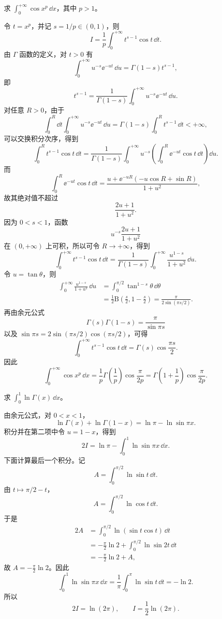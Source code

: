 \begin{xreferenceproblem}[13]
求 $\displaystyle\int_0^{+\infty}\cos x^p\,\dd x$，其中 $p>1$。
\end{xreferenceproblem}
\begin{xsolution}
令 $t=x^p$，并记 $s=1/p\in(0,1)$，则
\[
I=\frac1p\int_0^{+\infty}t^{s-1}\cos t\,\dd t.
\]
由 $\Gamma$ 函数的定义，对 $t>0$ 有
\[
\int_0^{+\infty}u^{-s}\ee^{-ut}\,\dd u
=\Gamma(1-s)t^{s-1},
\]
即
\[
t^{s-1}=\frac1{\Gamma(1-s)}
\int_0^{+\infty}u^{-s}\ee^{-ut}\,\dd u.
\]
对任意 $R>0$，由于
\[
\int_0^R\dd t\int_0^{+\infty}u^{-s}\ee^{-ut}\,\dd u
=\Gamma(1-s)\int_0^R t^{s-1}\,\dd t<+\infty,
\]
可以交换积分次序，得到
\[
\int_0^R t^{s-1}\cos t\,\dd t
=\frac1{\Gamma(1-s)}
\int_0^{+\infty}u^{-s}
\left(\int_0^R\ee^{-ut}\cos t\,\dd t\right)\dd u.
\]
而
\[
\int_0^R\ee^{-ut}\cos t\,\dd t
=\frac{u+\ee^{-uR}(-u\cos R+\sin R)}{1+u^2},
\]
故其绝对值不超过
\[
\frac{2u+1}{1+u^2}.
\]
因为 $0<s<1$，函数
\[
u^{-s}\frac{2u+1}{1+u^2}
\]
在 $(0,+\infty)$ 上可积，所以可令 $R\to+\infty$，得到
\[
\int_0^{+\infty}t^{s-1}\cos t\,\dd t
=\frac1{\Gamma(1-s)}
\int_0^{+\infty}\frac{u^{1-s}}{1+u^2}\,\dd u.
\]
令 $u=\tan\theta$，则
\[
\begin{aligned}
\int_0^{+\infty}\frac{u^{1-s}}{1+u^2}\,\dd u
&=\int_0^{\pi/2}\tan^{1-s}\theta\,\dd\theta\\
&=\frac12\mathrm{B}\left(\frac s2,1-\frac s2\right)
=\frac{\pi}{2\sin(\pi s/2)}.
\end{aligned}
\]
再由余元公式
\[
\Gamma(s)\Gamma(1-s)=\frac\pi{\sin\pi s}
\]
以及 $\sin\pi s=2\sin(\pi s/2)\cos(\pi s/2)$，可得
\[
\int_0^{+\infty}t^{s-1}\cos t\,\dd t
=\Gamma(s)\cos\frac{\pi s}{2}.
\]
因此
\[
\boxed{
\int_0^{+\infty}\cos x^p\,\dd x
=\frac1p\Gamma\left(\frac1p\right)
\cos\frac\pi{2p}
=\Gamma\left(1+\frac1p\right)\cos\frac\pi{2p}.}
\]
\end{xsolution}


\begin{xreferenceproblem}[14]
求 $\displaystyle\int_0^1\ln\Gamma(x)\,\dd x$。
\end{xreferenceproblem}
\begin{xsolution}
由余元公式，对 $0<x<1$，
\[
\ln\Gamma(x)+\ln\Gamma(1-x)
=\ln\pi-\ln\sin\pi x.
\]
积分并在第二项中令 $u=1-x$，得到
\[
2I=\ln\pi-\int_0^1\ln\sin\pi x\,\dd x.
\]
下面计算最后一个积分。记
\[
A=\int_0^{\pi/2}\ln\sin t\,\dd t.
\]
由 $t\mapsto\pi/2-t$，
\[
A=\int_0^{\pi/2}\ln\cos t\,\dd t.
\]
于是
\[
\begin{aligned}
2A
&=\int_0^{\pi/2}\ln(\sin t\cos t)\,\dd t\\
&=-\frac\pi2\ln2+
\int_0^{\pi/2}\ln\sin2t\,\dd t\\
&=-\frac\pi2\ln2+A,
\end{aligned}
\]
故 $A=-\frac\pi2\ln2$。因此
\[
\int_0^1\ln\sin\pi x\,\dd x
=\frac1\pi\int_0^\pi\ln\sin t\,\dd t=-\ln2.
\]
所以
\[
2I=\ln(2\pi),
\qquad
\boxed{I=\frac12\ln(2\pi)}.
\]
\end{xsolution}


